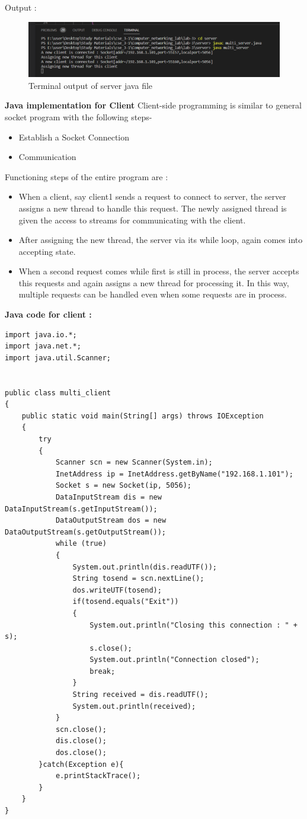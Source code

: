 \documentclass[11pt]{article}
\begin{document}
 Output : 
  \begin{figure}[!h]
\centering
\includegraphics[width=\textwidth]{mserver.png}
\caption{Terminal output of server java file }
\end{figure}
\FloatBarrier


\textbf{Java implementation for Client}
Client-side programming is similar to general socket program with the following steps-
 \begin{itemize}
        
        \item Establish a Socket Connection

        \item Communication
\end{itemize}
Functioning steps of the entire program are : 
 \begin{itemize}
        \item When a client, say client1 sends a request to connect to server, the server assigns a new thread to handle this request. The newly assigned thread is given the access to streams for communicating with the client.
        \item After assigning the new thread, the server via its while loop, again comes into accepting state.
        \item When a second request comes while first is still in process, the server accepts this requests and again assigns a new thread for processing it. In this way, multiple requests can be handled even when some requests are in process.
\end{itemize}

\vspace{.5cm}
\textbf{Java code for client : }\\[12pt]
\begin{verbatim}
import java.io.*;
import java.net.*;
import java.util.Scanner;


public class multi_client
{
	public static void main(String[] args) throws IOException
	{
		try
		{
			Scanner scn = new Scanner(System.in);
			InetAddress ip = InetAddress.getByName("192.168.1.101");
			Socket s = new Socket(ip, 5056);
			DataInputStream dis = new DataInputStream(s.getInputStream());
			DataOutputStream dos = new DataOutputStream(s.getOutputStream());
			while (true)
			{
				System.out.println(dis.readUTF());
				String tosend = scn.nextLine();
				dos.writeUTF(tosend);
				if(tosend.equals("Exit"))
				{
					System.out.println("Closing this connection : " + s);
					s.close();
					System.out.println("Connection closed");
					break;
				}
				String received = dis.readUTF();
				System.out.println(received);
			}
			scn.close();
			dis.close();
			dos.close();
		}catch(Exception e){
			e.printStackTrace();
		}
	}
}
\end{verbatim}
\end{document}
